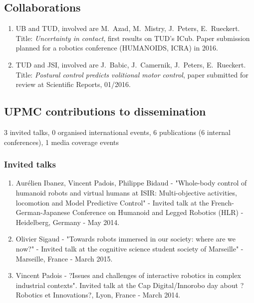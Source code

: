 \subsection{Collaborations}

\begin{enumerate}%
	\item UB and TUD, involved are M.~Azad, M.~Mistry, J.~Peters, E.~Rueckert. Title: \emph{Uncertainty in contact}, first results on TUD's ICub. Paper submission planned for a robotics conference (HUMANOIDS, ICRA) in 2016. 
	\item TUD and JSI, involved are J.~Babic, J.~Camernik, J.~Peters, E.~Rueckert. Title: \emph{Postural control predicts volitional motor control}, paper submitted for review at Scientific Reports, 01/2016.
\end{enumerate}

\subsection{UPMC contributions to dissemination}

3 invited talks, 0 organised international events, 6 publications (6 internal conferences), 1 media coverage events

\subsubsection{Invited talks}

\begin{enumerate}
\item Aurélien Ibanez, Vincent Padois, Philippe Bidaud - "Whole-body control of humanoid robots and virtual humans at ISIR: Multi-objective activities, locomotion and Model Predictive Control" - Invited talk at the French-German-Japanese Conference on Humanoid and Legged Robotics (HLR) - Heidelberg,  Germany - May 2014.

\item Olivier Sigaud - "Towards robots immersed in our society: where are we now?" - Invited talk at  the cognitive science student society of Marseille" -  Marseille, France - March 2015.

\item Vincent Padois - ?Issues and challenges of interactive robotics in complex industrial contexts". Invited talk at the Cap Digital/Innorobo day about ?Robotics et Innovations?, Lyon, France - March 2014.
\end{enumerate}

